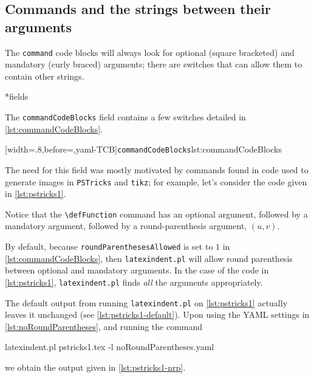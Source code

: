 \subsection{Commands and the strings between their arguments}\label{subsec:commands-string-between}
	The \texttt{command} code blocks will always look for optional (square bracketed) and
	mandatory (curly braced) arguments; there are switches that can allow them to contain
	other strings.

*{fields}

	The \texttt{commandCodeBlocks} field contains a few switches detailed in \cref{lst:commandCodeBlocks}.

	[width=.8\linewidth,before=\centering,yaml-TCB]{\texttt{commandCodeBlocks}}{lst:commandCodeBlocks}


	The need for this field was mostly motivated by commands found in code used to generate images in \texttt{PSTricks} and \texttt{tikz}; for example,
	let's consider the code given in \cref{lst:pstricks1}.

	\begin{minipage}{.45\textwidth}
	\end{minipage}
	\hfill
	\begin{minipage}{.45\textwidth}
	\end{minipage}

	Notice that the \lstinline!\defFunction! command has an optional argument, followed by a
	mandatory argument, followed by a round-parenthesis argument, $(u,v)$.

	By default, because \texttt{roundParenthesesAllowed} is set to $1$ in \cref{lst:commandCodeBlocks}, then \texttt{latexindent.pl}
	will allow round parenthesis between optional and mandatory arguments. In the case of the code in \cref{lst:pstricks1},
	\texttt{latexindent.pl} finds \emph{all} the arguments appropriately.

	The default output from running \texttt{latexindent.pl} on \cref{lst:pstricks1} actually leaves it unchanged (see \cref{lst:pstricks1-default}). Upon
	using the YAML settings in \cref{lst:noRoundParentheses}, and running the command
	\begin{commandshell}
latexindent.pl pstricks1.tex -l noRoundParentheses.yaml
        \end{commandshell}
	we obtain the output given in  \cref{lst:pstricks1-nrp}.

